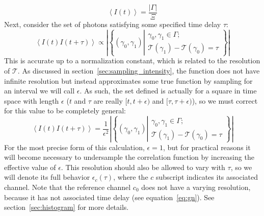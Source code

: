 \documentclass{article}
\newcommand{\braces}[1]{\ensuremath{\left\lbrace #1 \right\rbrace}}
\newcommand{\angles}[1]{\ensuremath{\left\langle #1 \right\rangle}}
\newcommand{\abs}[1]{\ensuremath{\left|#1\right|}}
\newcommand{\channel}{\ensuremath{c}}
\newcommand{\Time}{\ensuremath{\mathcal{T}}}
\newcommand{\photon}{\ensuremath{\gamma}}
\newcommand{\photons}{\ensuremath{\Gamma}}
\newcommand{\integrationtime}{\ensuremath{\Xi}}
\newcommand{\resolution}{\ensuremath{\epsilon}}
\begin{document}
\begin{equation}
\angles{I(t)} = \frac{\abs{\photons}}{\integrationtime}
\end{equation}
Next, consider the set of photons satisfying some specified time delay $\tau$:
\begin{equation}
\angles{I(t)I(t+\tau)}\propto
         \abs{\braces{(\photon_{0},\photon_{1})
               \left|\begin{aligned}
                     \photon_{0},\photon_{1}\in\photons;\\
                     \Time(\photon_{1})-\Time(\photon_{0})=\tau
                     \end{aligned}\right.}}
\end{equation}
This is accurate up to a normalization constant, which is related to the resolution of \Time. As discussed in section~\ref{sec:sampling_intensity}, the function does not have infinite resolution but instead approximates some true function by sampling for an interval we will call \resolution. As such, the set defined is actually for a square in time space with length \resolution{} ($t$ and $\tau$ are really $[t,t+\resolution)$ and $[\tau,\tau+\resolution)$), so we must correct for this value to be completely general:
\begin{equation}
\angles{I(t)I(t+\tau)}=    
         \frac{1}{\resolution^{2}}
         \abs{\braces{(\photon_{0},\photon_{1})
               \left|\begin{aligned}
                     \photon_{0},\photon_{1}\in\photons;\\
                     \Time(\photon_{1})-\Time(\photon_{0})=\tau
                     \end{aligned}\right.}}
\end{equation}
For the most precise form of this calculation, $\resolution=1$, but for practical reasons it will become necessary to undersample the correlation function by increasing the effective value of \resolution. This resolution should also be allowed to vary with $\tau$, so we will denote its full behavior $\resolution_{c}(\tau)$, where the $c$ subscript indicates its associated channel. Note that the reference channel $\channel_{0}$ does not have a varying resolution, because it has not associated time delay (see equation~\ref{eq:gn}). See section~\ref{sec:histogram} for more details.
\end{document}
